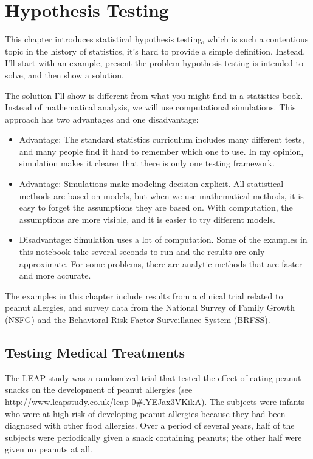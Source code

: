 \hypertarget{hypothesis-testing}{%
\chapter{Hypothesis Testing}\label{hypothesis-testing}}

This chapter introduces statistical hypothesis testing, which is such a
contentious topic in the history of statistics, it's hard to provide a
simple definition. Instead, I'll start with an example, present the
problem hypothesis testing is intended to solve, and then show a
solution.

The solution I'll show is different from what you might find in a
statistics book. Instead of mathematical analysis, we will use
computational simulations. This approach has two advantages and one
disadvantage:

\begin{itemize}
\item
  Advantage: The standard statistics curriculum includes many different
  tests, and many people find it hard to remember which one to use. In
  my opinion, simulation makes it clearer that there is only one testing
  framework.
\item
  Advantage: Simulations make modeling decision explicit. All
  statistical methods are based on models, but when we use mathematical
  methods, it is easy to forget the assumptions they are based on. With
  computation, the assumptions are more visible, and it is easier to try
  different models.
\item
  Disadvantage: Simulation uses a lot of computation. Some of the
  examples in this notebook take several seconds to run and the results
  are only approximate. For some problems, there are analytic methods
  that are faster and more accurate.
\end{itemize}

The examples in this chapter include results from a clinical trial
related to peanut allergies, and survey data from the National Survey of
Family Growth (NSFG) and the Behavioral Risk Factor Surveillance System
(BRFSS).

\hypertarget{testing-medical-treatments}{%
\section{Testing Medical Treatments}\label{testing-medical-treatments}}

The LEAP study was a randomized trial that tested the effect of eating
peanut snacks on the development of peanut allergies (see
\url{http://www.leapstudy.co.uk/leap-0\#.YEJax3VKikA}). The subjects
were infants who were at high risk of developing peanut allergies
because they had been diagnosed with other food allergies. Over a period
of several years, half of the subjects were periodically given a snack
containing peanuts; the other half were given no peanuts at all.


